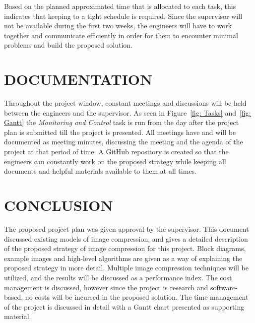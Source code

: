 \documentclass[10pt,twocolumn, a4paper]{witseiepaper}
\begin{document}
Based on the planned approximated time that is allocated to each task, this indicates that keeping to a tight schedule is required. Since the supervisor will not be available during the first two weeks, the engineers will have to work together and communicate efficiently in order for them to encounter minimal problems and build the proposed solution.

%
\section{DOCUMENTATION}
\label{sec: Documentation}
Throughout the project window, constant meetings and discussions will be held between the engineers and the supervisor. As seen in Figure~\ref{fig: Tasks} and~\ref{fig: Gantt} the \emph{Monitoring and Control} task is run from the day after the project plan is submitted till the project is presented. All meetings have and will be documented as meeting minutes, discussing the meeting and the agenda of the project at that period of time. A GitHub repository is created so that the engineers can constantly work on the proposed strategy while keeping all documents and helpful materials available to them at all times.

%
\section{CONCLUSION}
\label{sec: Conclusion}
The proposed project plan was given approval by the supervisor. This document discussed existing models of image compression, and gives a detailed description of the proposed strategy of image compression for this project. Block diagrams, example images and high-level algorithms are given as a way of explaining the proposed strategy in more detail. Multiple image compression techniques will be utilized, and the results will be discussed as a performance index. The cost management is discussed, however since the project is research and software-based, no costs will be incurred in the proposed solution. The time management of the project is discussed in detail with a Gantt chart presented as supporting material.
\end{document}
